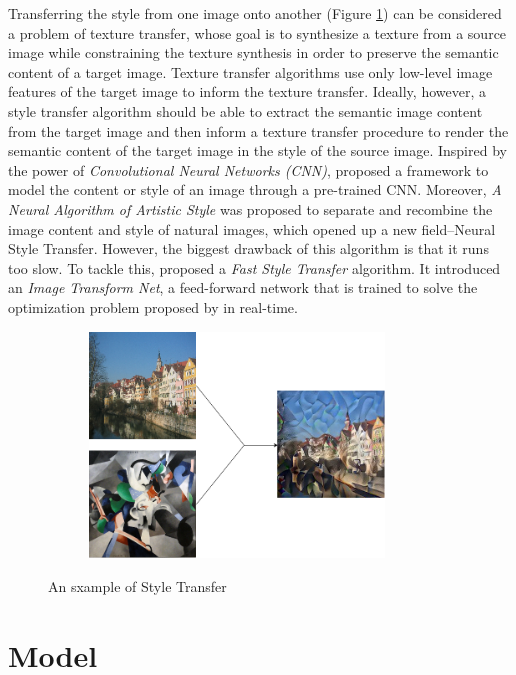 \documentclass{article} %
\begin{document}
Transferring the style from one image onto another (Figure \ref{fig:intro}) can be considered a problem of texture transfer, whose goal is to synthesize a texture from a source image while constraining the texture synthesis in order to preserve the semantic content of a target image. Texture transfer algorithms use only low-level image features of the target image to inform the texture transfer. Ideally, however, a style transfer algorithm should be able to extract the semantic image content from the target image and then inform a texture transfer procedure to render the semantic content of the target image in the style of the source image. Inspired by the power of \emph{Convolutional Neural Networks (CNN)}, \cite{1508.06576} proposed a framework to model the content or style of an image through a pre-trained CNN. Moreover, \emph{A Neural Algorithm of Artistic Style} was proposed to separate and recombine the image content and style of natural images, which opened up a new field--Neural Style Transfer. However, the biggest drawback of this algorithm is that it runs too slow. To tackle this, \cite{1603.08155} proposed a \emph{Fast Style Transfer} algorithm. It introduced an \emph{Image Transform Net}, a feed-forward network that is trained to solve the optimization problem proposed by \cite{1508.06576} in real-time.
\begin{figure}[h]
\centering
\includegraphics[height=6cm, width=10cm]{intro.png}
\label{fig:intro}
\caption{An sxample of Style Transfer}

\end{figure}



\section{Model}
\label{model}
\end{document}
